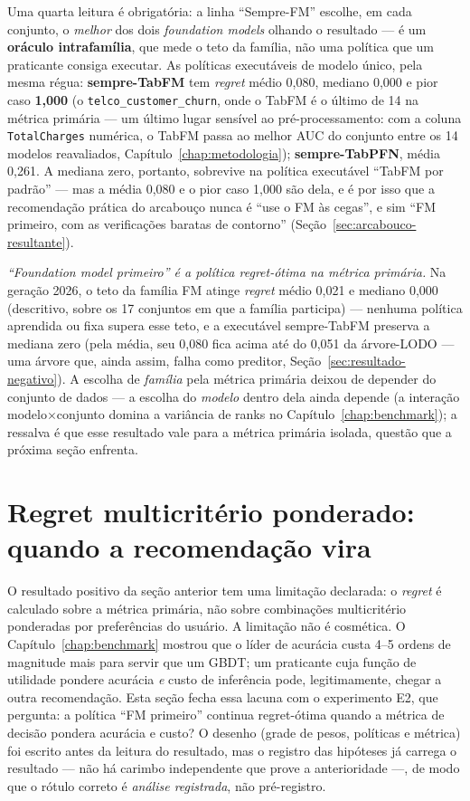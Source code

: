 Uma quarta leitura é obrigatória: a linha ``Sempre-FM'' escolhe, em
cada conjunto, o \emph{melhor} dos dois \emph{foundation models}
olhando o resultado --- é um \textbf{oráculo intrafamília}, que mede o
teto da família, não uma política que um praticante consiga executar.
As políticas executáveis de modelo único, pela mesma régua:
\textbf{sempre-TabFM} tem \emph{regret} médio 0,080, mediano 0,000 e
pior caso \textbf{1,000} (o \texttt{telco\_customer\_churn}, onde o
TabFM é o último de 14 na métrica primária --- um último lugar sensível
ao pré-processamento: com a coluna \texttt{TotalCharges} numérica, o
TabFM passa ao melhor AUC do conjunto entre os 14 modelos reavaliados,
Capítulo~\ref{chap:metodologia});
\textbf{sempre-TabPFN}, média 0,261. A mediana zero, portanto,
sobrevive na política executável ``TabFM por padrão'' --- mas a média
0,080 e o pior caso 1,000 são dela, e é por isso que a recomendação
prática do arcabouço nunca é ``use o FM às cegas'', e sim ``FM
primeiro, com as verificações baratas de contorno''
(Seção~\ref{sec:arcabouco-resultante}).

\emph{``Foundation model primeiro'' é a política regret-ótima na
métrica primária.} Na geração 2026, o teto da família FM atinge
\emph{regret} médio 0,021 e mediano 0,000 (descritivo, sobre os 17
conjuntos em que a família participa) --- nenhuma política
aprendida ou fixa supera esse teto, e a executável sempre-TabFM
preserva a
mediana zero (pela média, seu 0,080 fica acima até do 0,051 da
árvore-LODO --- uma árvore que, ainda assim, falha como preditor,
Seção~\ref{sec:resultado-negativo}). A escolha de \emph{família} pela métrica primária deixou de
depender do conjunto de dados --- a escolha do \emph{modelo} dentro
dela ainda depende (a interação modelo$\times$conjunto domina a
variância de ranks no Capítulo~\ref{chap:benchmark}); a ressalva é
que esse resultado vale para a métrica primária isolada, questão que a
próxima seção enfrenta.

\section{Regret multicritério ponderado: quando a recomendação vira}
\label{sec:regret-ponderado}

O resultado positivo da seção anterior tem uma limitação declarada:
o \emph{regret} é calculado sobre a métrica primária,
não sobre combinações multicritério ponderadas por preferências do
usuário. A limitação não é cosmética. O Capítulo~\ref{chap:benchmark}
mostrou que o líder de acurácia custa 4--5 ordens de magnitude mais
para servir que um GBDT; um praticante cuja função de utilidade pondere
acurácia \emph{e} custo de inferência pode, legitimamente, chegar a
outra recomendação. Esta seção fecha essa lacuna com o experimento E2, que pergunta: a
política ``FM primeiro'' continua regret-ótima quando a métrica de
decisão pondera acurácia e custo? O desenho (grade de pesos, políticas
e métrica) foi escrito antes da leitura do resultado, mas o registro
das hipóteses já carrega o resultado --- não há carimbo
independente que prove a anterioridade ---, de modo que o rótulo
correto é \emph{análise registrada}, não pré-registro.

